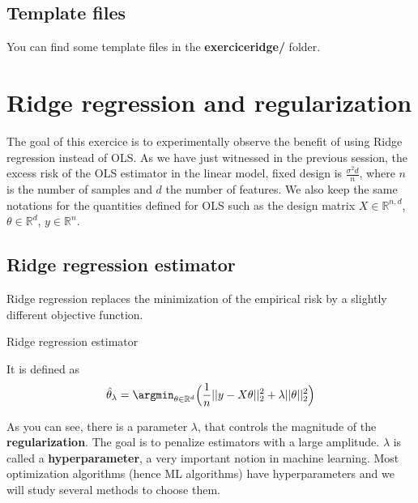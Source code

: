 \documentclass[
10pt, %
a4paper, %
oneside, %
headinclude,footinclude, %
BCOR5mm, %
]{scrartcl}
\begin{document}
\subsection*{Template files}

You can find some template files in the \textbf{exercice\textunderscore ridge/} folder.

\section{\large\color{Blue}Ridge regression and regularization}
\label{sec:ridge}

The goal of this exercice is to experimentally observe the benefit of using
Ridge regression instead of OLS. As we have just witnessed in the previous session, the
excess risk of the OLS estimator in the linear model, fixed design is $ \frac{\sigma^2d}{n} $, where $n$ is the number of samples and $d$ the number of features. We also keep the same notations for the quantities defined for OLS such as the design matrix $X\in\mathbb{R}^{n, d}$, $\theta\in\mathbb{R}^d$, $y\in\mathbb{R}^n$.
\\

\subsection{Ridge regression estimator}

Ridge regression replaces the minimization of the empirical risk by a slightly different
objective function.

\begin{definition}{Ridge regression estimator}

    It is defined as
\begin{equation}
    \label{risk:ridge}
    \hat{ \theta}_{\lambda} = \argmin_{\theta \in \mathbb{R}^d} \Big( \frac{1}{n} ||y-X\theta||_2^2 + \lambda || \theta||_2^2 \Big)
\end{equation}
\end{definition}

As you can see, there is a parameter $\lambda$, that controls the magnitude of
the \textbf{regularization}. The goal is to penalize estimators with a large
amplitude. $\lambda$ is called a \textbf{hyperparameter}, a very important notion in machine
learning. Most optimization algorithms (hence ML algorithms) have
hyperparameters and we will study several methods to choose them.
\\
\end{document}
